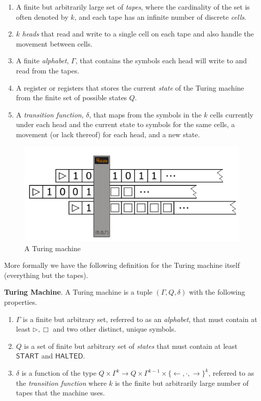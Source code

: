\documentclass[usletter]{article}
\begin{document}
\begin{enumerate}
  \item A finite but arbitrarily large set of \textit{tapes},  where the cardinality of the set is often denoted by $k$, and each tape has an infinite number of discrete \textit{cells}.
  \item $k$ \textit{heads} that read and write to a single cell on each tape and also handle the movement between cells.
  \item A finite \textit{alphabet}, $\Gamma$, that contains the symbols each head will write to and read from the tapes.
  \item A register or registers that stores the current \textit{state} of the Turing machine from the finite set of possible states $Q$.
  \item A \textit{transition function}, $\delta$, that maps from the symbols in the $k$ cells currently under each head and the current state to symbols for the same cells, a movement (or lack thereof) for each head, and a new state.
\end{enumerate}

\begin{figure}
\begin{center}
\includegraphics[width=1\textwidth]{lectures/graphics/turing-machine}
\end{center}
\caption{A Turing machine}
\label{fig:turing-machine}
\end{figure}

More formally we have the following definition for the Turing machine itself (everything but the tapes).

\begin{definition}
  \textbf{Turing Machine}. A Turing machine is a tuple $(\Gamma, Q, \delta)$ with the following properties.
  \begin{enumerate}
    \item $\Gamma$ is a finite but arbitrary set, referred to as an \textit{alphabet}, that must contain at least $\rhd, \Box$ and two other distinct, unique symbols.
    \item $Q$ is a set of finite but arbitrary set of \textit{states} that must contain at least $\textsf{START}$ and $\textsf{HALTED}$.
    \item $\delta$ is a function of the type $Q \times \Gamma^{k} \rightarrow Q \times \Gamma^{k-1} \times \{\leftarrow, \cdot, \rightarrow\}^k$, referred to as the \textit{transition function} where $k$ is the finite but arbitrarily large number of tapes that the machine uses.
  \end{enumerate}
\end{definition}
\end{document}
